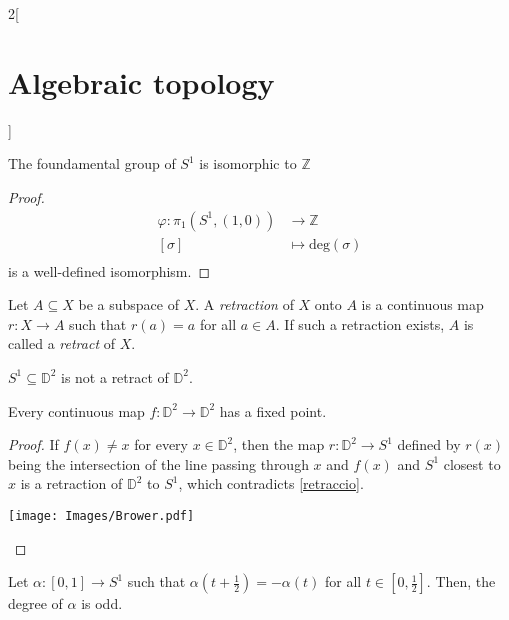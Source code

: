 \documentclass[../../../main_math.tex]{subfiles}
\begin{document}
\begin{multicols}{2}[\section{Algebraic topology}]
	\begin{theorem}
		The foundamental group of $S^1$ is isomorphic to $\mathbb{Z}$
	\end{theorem}
	
	\begin{proof}
		\begin{align*}
			\varphi: \pi_1(S^1, (1,0)) &\longrightarrow \mathbb{Z} \\
			[\sigma]&\longmapsto \text{deg}(\sigma) \\
		\end{align*}
		is a well-defined isomorphism.
	\end{proof}
	
	\begin{definition}
		Let $A\subseteq X$ be a subspace of $X$. A \emph{retraction} of $X$ onto $A$ is a continuous map $r: X \to A$ such that $r(a)=a$ for all $a\in A$. If such a retraction exists, $A$ is called a \emph{retract} of $X$. 
	\end{definition}

	\begin{corollary}\label{retraccio}
		$S^1\subseteq \mathbb{D}^2$ is not a retract of $\mathbb{D}^2$.
	\end{corollary}


	\begin{theorem}
		\label{Brower}
		Every continuous map $f:\mathbb{D}^2 \to \mathbb{D}^2$ has a fixed point. 
	\end{theorem}

	\begin{proof}
		
		\begin{minipage}{0.3\textwidth}
			If $f(x)\neq x$ for every $x\in \mathbb{D}^2$, then the map $r: \mathbb{D}^2 \to S^1$ defined by $r(x)$ being the intersection of the line passing through $x$ and $f(x)$ and $S^1$ closest to $x$ is a retraction of $\mathbb{D}^2$ to $S^1$, which contradicts \cref{retraccio}.
		\end{minipage}
		\begin{minipage}{0.2\textwidth}
			\begin{center}
				\texttt{[image: Images/Brower.pdf]}
			\end{center}
		\end{minipage}

	\end{proof}
	
	\begin{lemma} \label{lema Borsuk}
		Let $\alpha:[0,1]\to S^1$ such that $\alpha(t+\frac{1}{2})=-\alpha(t)$ for all $t\in[0,\frac{1}{2}]$. Then, the degree of $\alpha$ is odd.
	\end{lemma}


\end{multicols}
\end{document}
